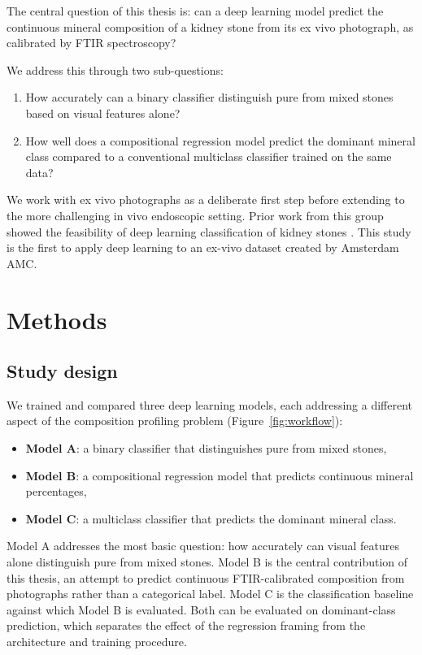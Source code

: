 \documentclass[10pt,twocolumn]{article}
\begin{document}
The central question of this thesis is: can a deep learning model predict the continuous mineral composition of a kidney stone from its ex vivo photograph, as calibrated by FTIR spectroscopy?

We address this through two sub-questions:

\begin{enumerate}
    \item How accurately can a binary classifier distinguish pure from mixed stones based on visual features alone?
    \item How well does a compositional regression model predict the dominant mineral class compared to a conventional multiclass classifier trained on the same data?
\end{enumerate}

We work with ex vivo photographs as a deliberate first step before extending to the more challenging in vivo endoscopic setting. Prior work from this group showed the feasibility of deep learning classification of kidney stones \cite{veltheer2025}. This study is the first to apply deep learning to an ex-vivo dataset created by Amsterdam AMC.

\section*{Methods}

\subsection*{Study design}

We trained and compared three deep learning models, each addressing a different aspect of the composition profiling problem (Figure~\ref{fig:workflow}):

\begin{itemize}
    \item \textbf{Model A}: a binary classifier that distinguishes pure from mixed stones,
    \item \textbf{Model B}: a compositional regression model that predicts continuous mineral percentages,
    \item \textbf{Model C}: a multiclass classifier that predicts the dominant mineral class.
\end{itemize}

Model A addresses the most basic question: how accurately can visual features alone distinguish pure from mixed stones. Model B is the central contribution of this thesis, an attempt to predict continuous FTIR-calibrated composition from photographs rather than a categorical label. Model C is the classification baseline against which Model B is evaluated.  Both can be evaluated on dominant-class prediction, which separates the effect of the regression framing from the architecture and training procedure.
\end{document}
